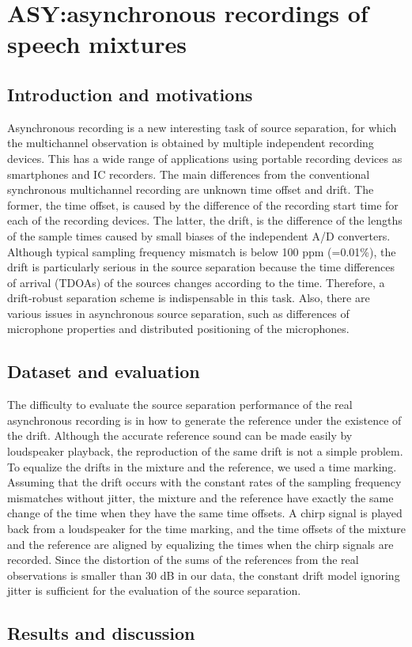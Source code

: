 
\section{ASY:asynchronous recordings of speech mixtures}\label{sec:ASY}

\subsection{Introduction and motivations}
Asynchronous recording is a new interesting task of source separation, for which the multichannel observation is obtained by multiple independent recording devices. This has a wide range of applications using portable recording devices as smartphones and IC recorders.
The main differences from the conventional synchronous multichannel recording are unknown time offset and drift. The former, the time offset, is caused by the difference of the recording start time for each of the recording devices. The latter, the drift, is the difference of the lengths of the sample times caused by small biases of the independent A/D converters. Although typical sampling frequency mismatch is below 100 ppm (=0.01\%), the drift is particularly serious in the source separation because the time differences of arrival (TDOAs) of the sources changes according to the time. Therefore, a drift-robust separation scheme is indispensable in this task. Also, there are various issues in asynchronous source separation, such as differences of microphone properties and distributed positioning of the microphones.

\subsection{Dataset and evaluation}
The difficulty to evaluate the source separation performance of the real asynchronous recording is in how to generate the reference under the existence of the drift. Although the accurate reference sound can be made easily by loudspeaker playback, the reproduction of the same drift is not a simple problem. To equalize the drifts in the mixture and the reference, we used a time marking. Assuming that the drift occurs with the constant rates of the sampling frequency mismatches without jitter, the mixture and the reference have exactly the same change of the time when they have the same time offsets. A chirp signal is played back from a loudspeaker for the time marking, and the time offsets of the mixture and the reference are aligned by equalizing the times when the chirp signals are recorded. Since the distortion of the sums of the references from the real observations is smaller than 30 dB in our data, the constant drift model ignoring jitter is sufficient for the evaluation of the source separation.

\subsection{Results and discussion}
